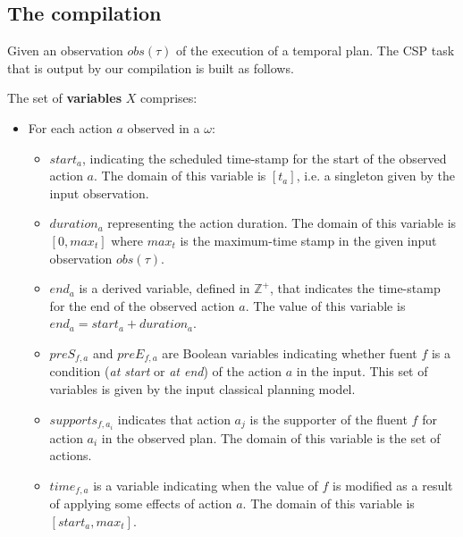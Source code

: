 \documentclass[letterpaper]{article} %
\begin{document}
\subsection{The compilation}
Given an observation $obs(\tau)$ of the execution of a temporal plan. The CSP task that is output by our compilation is built as follows.

The set of {\bf variables} $X$ comprises:
\begin{itemize}
\item For each action $a$ observed in a $\omega$:
\begin{itemize}
\item $start_a$, indicating the scheduled time-stamp for the start of the observed action $a$. The domain of this variable is $[t_a]$, i.e. a singleton given by the input observation.
\item $duration_a$ representing the action duration. The domain of this variable is $[0,max_t]$ where $max_t$ is the maximum-time stamp in the given input observation $obs(\tau)$.
\item $end_a$ is a derived variable, defined in $\mathds{Z}^+$, that indicates the time-stamp for the end of the observed action $a$. The value of this variable is $end_a = start_a + duration_a$. 
\item $preS_{f,a}$ and $preE_{f,a}$ are Boolean variables indicating whether fuent $f$ is a condition ({\em at start} or {\em at end}) of the action $a$ in the input. This set of variables is given by the input classical planning model.
\item $supports_{f,a_i}$ indicates that action $a_j$ is the supporter of the fluent $f$ for action $a_i$ in the observed plan. The domain of this variable is the set of actions.
\item $time_{f,a}$ is a variable indicating when the value of $f$ is modified as a result of applying some effects of action $a$. The domain of this variable is $[start_a,max_t]$.
\end{itemize}
\end{itemize}
\end{document}
